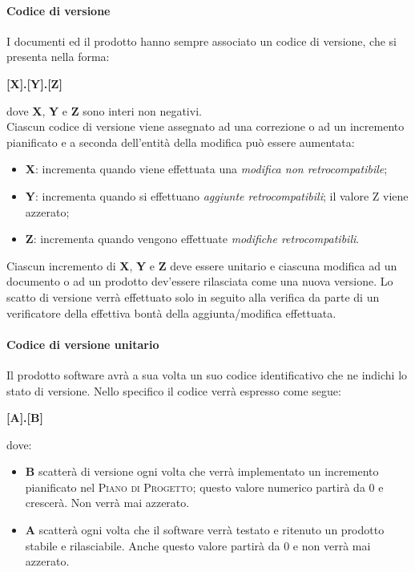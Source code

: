 \paragraph{Codice di versione}
\label{par:codice_versione}

I documenti ed il prodotto hanno sempre associato un codice di versione, che si presenta nella forma:
\begin{center}
    \textbf{[X].[Y].[Z]}
\end{center}
dove \textbf{X}, \textbf{Y} e \textbf{Z} sono interi non negativi.\\
Ciascun codice di versione viene assegnato ad una correzione o ad un incremento pianificato e a seconda dell'entit\`{a} della modifica
pu\`{o} essere aumentata:
\begin{itemize}
	\item \textbf{X}: incrementa quando viene effettuata una \emph{modifica non retrocompatibile};
	\item \textbf{Y}: incrementa quando si effettuano \emph{aggiunte  retrocompatibili}; il valore Z viene azzerato;
	\item \textbf{Z}: incrementa quando vengono effettuate \emph{modifiche retrocompatibili}.
\end{itemize}
Ciascun incremento di \textbf{X}, \textbf{Y} e \textbf{Z} deve essere unitario e ciascuna modifica ad un documento o ad un prodotto
dev'essere rilasciata come una nuova versione.
Lo scatto di versione verrà effettuato solo in seguito alla verifica da parte di un verificatore della effettiva bontà della aggiunta/modifica effettuata.

\paragraph{Codice di versione unitario}
Il prodotto software avrà a sua volta un suo codice identificativo che ne indichi lo stato di versione. Nello specifico il codice verrà espresso come segue:\\
\begin{center}
    \textbf{[A].[B]}
\end{center}

dove:
\begin{itemize}
\item \textbf{B} scatterà di versione ogni volta che verrà implementato un incremento pianificato nel \textsc{Piano di Progetto}; questo valore numerico partirà da 0 e crescerà. Non verrà mai azzerato.
\item \textbf{A} scatterà ogni volta che il software verrà testato e ritenuto un prodotto stabile e rilasciabile. Anche questo valore partirà da 0 e non verrà mai azzerato.
\end{itemize}

